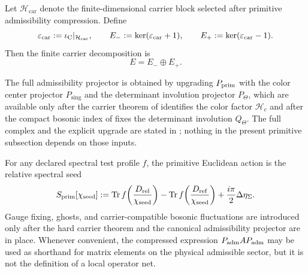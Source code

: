 \begin{definition}
\label{def:carrier-polarization-involution}
Let $\mathcal H_{\mathrm{car}}$ denote the finite-dimensional carrier block selected after
primitive admissibility compression. Define
\[
\varepsilon_{\mathrm{car}}:=\iota_{\mathrm C}|_{\mathcal H_{\mathrm{car}}},
\qquad
E_-:=\ker(\varepsilon_{\mathrm{car}}+1),
\qquad
E_+:=\ker(\varepsilon_{\mathrm{car}}-1).
\]
Then the finite carrier decomposition is
\[
E=E_-\oplus E_+.
\]
\end{definition}

\begin{remark}
\label{rem:forward-Padm}
The full admissibility projector is obtained by upgrading $P_{\mathrm{prim}}$ with the color center
projector $P_{\mathrm{sing}}$ and the determinant involution projector $P_\Theta$, which are
available only after the carrier theorem of  identifies the
color factor $\mathcal H_c$ and after the compact bosonic index of 
fixes the determinant involution $Q_\Theta$. The full complex and the explicit upgrade are
stated in ; nothing in the present
primitive subsection depends on those inputs.
\end{remark}

\begin{definition}
For any declared spectral test profile $f$, the primitive Euclidean action is the relative
spectral seed
\[
S_{\mathrm{prim}}[\chi_{\mathrm{seed}}]
:=
\operatorname{Tr} f\!\left(\frac{D_{\mathrm{rel}}}{\chi_{\mathrm{seed}}}\right)
-
\operatorname{Tr} f\!\left(\frac{D_{\mathrm{ref}}}{\chi_{\mathrm{seed}}}\right)
+\frac{i\pi}{2}\Delta\eta_\Sigma.
\]
Gauge fixing, ghosts, and carrier-compatible bosonic fluctuations are introduced only after the
hard carrier theorem and the canonical admissibility projector are in place. Whenever convenient,
the compressed expression $P_{\mathrm{adm}} AP_{\mathrm{adm}}$ may be used as shorthand for matrix elements on the
physical admissible sector, but it is not the definition of a local operator net.
\end{definition}

